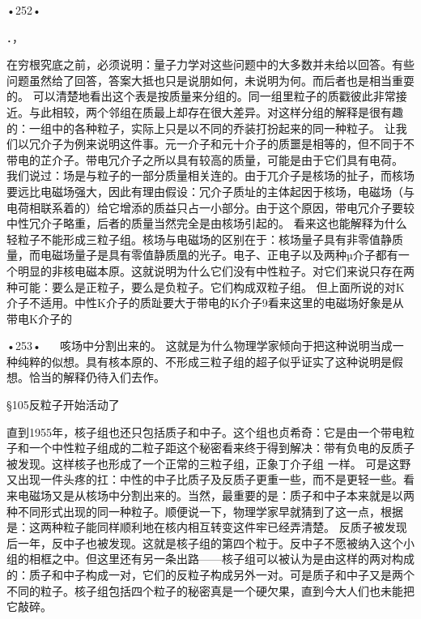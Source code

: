 •252•
  

．，
 
在穷根究底之前，必须说明：量子力学对这些问题中的大多数并未给以回答。有些问题虽然给了回答，答案大抵也只是说朋如何，未说明为何。而后者也是相当重耍的。
可以清楚地看出这个表是按质量来分组的。同一组里粒子的质戳彼此非常接近。与此相较，两个邻组在质最上却存在很大差异。对这样分组的解释是很有趣的：一组中的各种粒子，实际上只是以不同的乔装打扮起来的同一种粒子。
让我们以冗介子为例来说明这件事。元一介子和元十介子的质噩是相等的，但不同于不带电的芷介子。带电冗介子之所以具有较高的质量，可能是由于它们具有电荷。
我们说过：场是与粒子的一部分质量相关连的。由于兀介子是核场的扯子，而核场要远比电磁场强大，因此有理由假设：冗介子质址的主体起因于核场，电磁场（与电荷相联系着的）给它增添的质益只占一小部分。由于这个原因，带电冗介子要较中性冗介子略重，后者的质量当然完全是由核场引起的。
看来这也能解释为什么轻粒子不能形成三粒子组。核场与电磁场的区别在于：核场量子具有非零值静质量，而电磁场量子是具有零值静质凰的光子。电子、正电子以及两种µ介子都有一个明显的非核电磁本原。这就说明为什么它们没有中性粒子。对它们来说只存在两种可能：要么是正粒子，要么是负粒子。它们构成双粒子组。
但上面所说的对K介子不适用。中性K介子的质趾要大于带电的K介子9看来这里的电磁场好象是从带电K介子的

•253•
  
咳场中分割出来的。
这就是为什么物理学家倾向于把这种说明当成一种纯粹的似想。具有核本原的、不形成三粒子组的超子似乎证实了这种说明是假想。恰当的解释仍待入们去作。

§105反粒子开始活动了

直到1955年，核子组也还只包括质子和中子。这个组也贞希奇：它是由一个带电粒子和一个中性粒子组成的二粒子距这个秘密看来终于得到解决：带有负电的反质子被发现。这样核子也形成了一个正常的三粒子组，正象丁介子组
一样。
可是这野又出现一件头疼的扛：中性的中子比质子及反质子更重一些，而不是更轻一些。看来电磁场又是从核场中分割出来的。当然，最重要的是：质子和中子本来就是以两种不同形式出现的同一种粒子。顺便说一下，物理学家早就猜到了这一点，根据是：这两种粒子能同样顺利地在核内相互转变这件牢已经弄清楚。
反质子被发现后一年，反中子也被发现。这就是核子组的第四个粒于。反中子不愿被纳入这个小组的相框之中。但这里还有另一条出路——核子组可以被认为是由这样的两对构成的：质子和中子构成一对，它们的反粒子构成另外一对。可是质子和中子又是两个不同的粒子。核子组包括四个粒子的秘密真是一个硬欠果，直到今大人们也未能把它敲碎。

